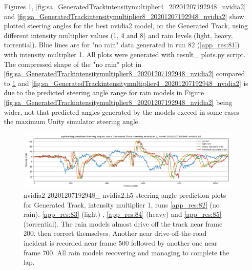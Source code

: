 Figures
\ref{fig:sa_GeneratedTrackintensitymultiplier1_20201207192948_nvidia2}, 
\ref{fig:sa_GeneratedTrackintensitymultiplier4_20201207192948_nvidia2} and 
\ref{fig:sa_GeneratedTrackintensitymultiplier8_20201207192948_nvidia2} show
plotted steering angles for the best nvidia2 model, on the Generated Track, using different intensity multiplier values (1, 4 and 8) and rain levels (light, heavy, torrential). Blue lines are for "no rain" data generated in run 82 (\ref{app_res:81}) with intensity multiplier 1.  All plots were generated with result\_ plots.py script. The compressed shape of the "no rain" plot in \ref{fig:sa_GeneratedTrackintensitymultiplier8_20201207192948_nvidia2} compared to \ref{fig:sa_GeneratedTrackintensitymultiplier1_20201207192948_nvidia2} and
\ref{fig:sa_GeneratedTrackintensitymultiplier4_20201207192948_nvidia2} is due to the predicted steering angle range for rain models in Figure \ref{fig:sa_GeneratedTrackintensitymultiplier8_20201207192948_nvidia2} being wider, not that predicted angles generated by the models exceed in some cases the maximum Unity simulator steering angle.


\begin{figure}[h!]
 \centering 
 \includegraphics[width=\textwidth]{Figures/sa_GeneratedTrackintensitymultiplier1_20201207192948_nvidia2.h5}
 \caption{nvidia2 20201207192948\_ nvidia2.h5 steering angle prediction plots for Generated Track, intensity multiplier 1, runs \ref{app_res:82} (no rain), \ref{app_res:83} (light) , \ref{app_res:84} (heavy) and  \ref{app_res:85} (torrential). The rain models almost drive off the track near frame 200, then correct themselves. Another near drive-off-the-road incident is recorded near frame 500 followed by another one near frame 700. All rain models recovering and managing to complete the lap.}
 \label{fig:sa_GeneratedTrackintensitymultiplier1_20201207192948_nvidia2} 
\end{figure}

